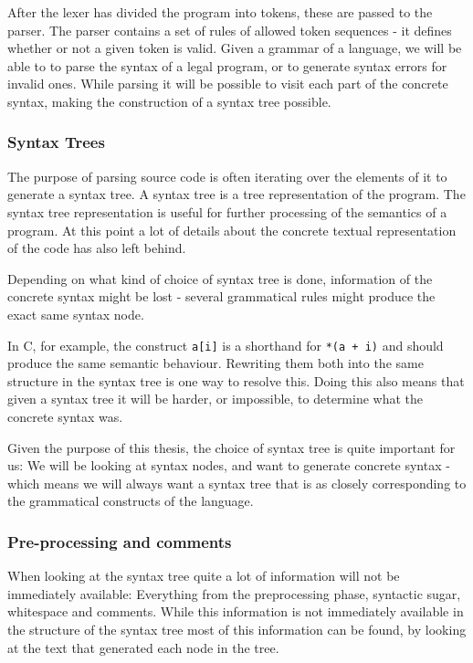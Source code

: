 \documentclass[11pt]{article}
\begin{document}
After the lexer has divided the program into tokens, these are passed to the parser. The parser contains a set of rules of allowed token sequences - it defines whether or not a given token is valid. Given a grammar of a language, we will be able to to parse the syntax of a legal program, or to generate syntax errors for invalid ones. While parsing it will be possible to visit each part of the concrete syntax, making the construction of a syntax tree possible.

\subsubsection{Syntax Trees}
The purpose of parsing source code is often iterating over the elements of it to generate a syntax tree. A syntax tree is a tree representation of the program. The syntax tree representation is useful for further processing of the semantics of a program. At this point a lot of details about the concrete textual representation of the code has also left behind.

Depending on what kind of choice of syntax tree is done, information of the concrete syntax might be lost - several grammatical rules might produce the exact same syntax node.

In C, for example, the construct \texttt{a[i]} is a shorthand for \texttt{*(a + i)} and should produce the same semantic behaviour. Rewriting them both into the same structure in the syntax tree is one way to resolve this. Doing this also means that given a syntax tree it will be harder, or impossible, to determine what the concrete syntax was.

Given the purpose of this thesis, the choice of syntax tree is quite important for us: We will be looking at syntax nodes, and want to generate concrete syntax - which means we will always want a syntax tree that is as closely corresponding to the grammatical constructs of the language.

\subsubsection{Pre-processing and comments}
When looking at the syntax tree quite a lot of information will not be immediately available: Everything from the preprocessing phase, syntactic sugar, whitespace and comments. While this information is not immediately available in the structure of the syntax tree most of this information can be found, by looking at the text that generated each node in the tree. 
\end{document}
